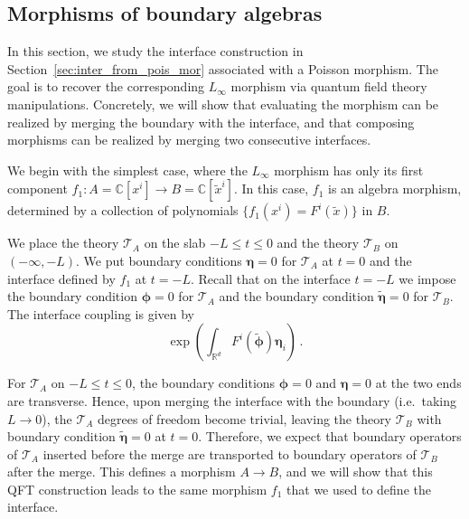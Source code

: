 \documentclass[11pt]{article}
\newcommand{\C}{\mathbb{C}}
\newcommand{\R}{\mathbb{R}}
\numberwithin{equation}{section}
\begin{document}
\subsection{Morphisms of boundary algebras}

In this section, we study the interface construction in Section~\ref{sec:inter_from_pois_mor} associated with a Poisson morphism. The goal is to recover the corresponding $L_\infty$ morphism via quantum field theory manipulations. Concretely, we will show that evaluating the morphism can be realized by merging the boundary with the interface, and that composing morphisms can be realized by merging two consecutive interfaces.

We begin with the simplest case, where the $L_\infty$ morphism has only its first component $f_1:A=\C[x^i]\to B=\C[\widetilde{x}^i]$. In this case, $f_1$ is an algebra morphism, determined by a collection of polynomials $\{f_1(x^i)=F^i(\widetilde{x})\}$ in $B$.

We place the theory $\mathcal{T}_A$ on the slab $-L\le t\le 0$ and the theory $\mathcal{T}_B$ on $(-\infty,-L)$. We put boundary conditions $\boldsymbol{\eta}=0$ for $\mathcal{T}_A$ at $t=0$ and the interface defined by $f_1$ at $t=-L$. Recall that on the interface $t=-L$ we impose the boundary condition $\boldsymbol{\phi}=0$ for $\mathcal{T}_A$ and the boundary condition $\widetilde{\boldsymbol{\eta}}=0$ for $\mathcal{T}_B$. The interface coupling is given by
\begin{equation}
\exp\left(\int_{\R^d}F^i(\widetilde{\boldsymbol{\phi}})\boldsymbol{\eta}_i\right)\,.
\end{equation}

For $\mathcal{T}_A$ on $-L\le t\le 0$, the boundary conditions $\boldsymbol{\phi}=0$ and $\boldsymbol{\eta}=0$ at the two ends are transverse. Hence, upon merging the interface with the boundary (i.e.\ taking $L\to 0$), the $\mathcal{T}_A$ degrees of freedom become trivial, leaving the theory $\mathcal{T}_B$ with boundary condition $\widetilde{\boldsymbol{\eta}}=0$ at $t=0$. Therefore, we expect that boundary operators of $\mathcal{T}_A$ inserted before the merge are transported to boundary operators of $\mathcal{T}_B$ after the merge. This defines a morphism $A\to B$, and we will show that this QFT construction leads to the same morphism $f_1$ that we used to define the interface.
\end{document}
